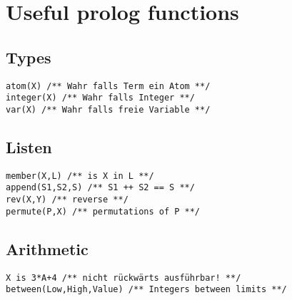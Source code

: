 \section{Useful prolog functions}
\subsection{Types}
\begin{verbatim}
atom(X) /** Wahr falls Term ein Atom **/
integer(X) /** Wahr falls Integer **/
var(X) /** Wahr falls freie Variable **/
\end{verbatim}
\subsection{Listen}
\begin{verbatim}
member(X,L) /** is X in L **/
append(S1,S2,S) /** S1 ++ S2 == S **/
rev(X,Y) /** reverse **/
permute(P,X) /** permutations of P **/
\end{verbatim}
\subsection{Arithmetic}
\begin{verbatim}
X is 3*A+4 /** nicht rückwärts ausführbar! **/
between(Low,High,Value) /** Integers between limits **/  
\end{verbatim}